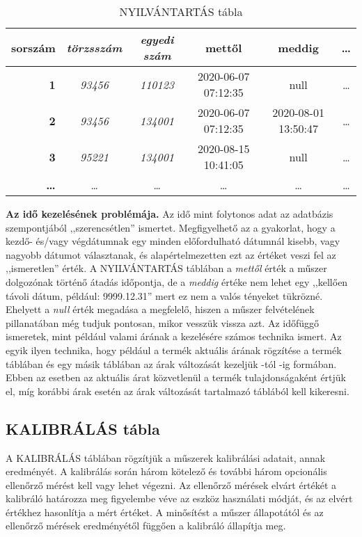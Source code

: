 \documentclass[a4paper,12pt]{report}
\newcommand{\tabla}[1]{\noindent\MakeUppercase{#1}} %
\begin{document}
\begin{table}[ht!]
	\centering
	\begin{footnotesize}
	\begin{tabular}[t]{|r|c|c|c|c|c|}
		\hline
		\textbf{sorszám}&\textit{törzsszám}&\textit{egyedi szám}&mettől&meddig&\dots \\ \hline
		\textbf{1}&\textit{93456}&\textit{110123}&2020-06-07 07:12:35&null&\dots\\
		\textbf{2}&\textit{93456}&\textit{134001}&2020-06-07 07:12:35&2020-08-01 13:50:47&\dots\\
		\textbf{3}&\textit{95221}&\textit{134001}&2020-08-15 10:41:05&null&\dots\\
		\textbf{\dots}&\textit{\dots}&\textit{\dots}&\dots&\dots&\dots\\
	\end{tabular}
\end{footnotesize}
	\caption{NYILVÁNTARTÁS tábla}\label{tabNYILVANTARTAS}
\end{table}


\begin{minipage}[t]{\linewidth}
\textsf{
		{\footnotesize \textbf{Az idő kezelésének problémája.}
	Az idő mint folytonos adat az adatbázis szempontjából ,,szerencsétlen'' ismertet. 
	Meg\-fi\-gyel\-he\-tő az a gyakorlat, hogy a kezdő- és/vagy végdátumnak egy minden előfordulható dátumnál kisebb, vagy nagyobb dátumot választanak, és alapértelmezetten ezt az értéket veszi fel az ,,ismeretlen'' érték.
	A \tabla{nyilvántartás} táblában a \textit{mettől} érték a műszer dolgozónak történő átadás időpontja, de a \textit{meddig} értéke nem lehet egy ,,kellően távoli dátum, például: 9999.12.31'' mert ez nem a valós tényeket tükrözné. Ehelyett a \textit{null} érték megadása a megfelelő, hiszen a műszer felvételének pillanatában még tudjuk pontosan, mikor vesszük vissza azt.
	Az időfüggő ismeretek, mint például valami árának a kezelésére számos technika ismert. Az egyik ilyen technika, hogy például a termék aktuális árának rögzítése a termék táblában és egy másik táblában az árak változását kezeljük -tól -ig formában. Ebben az esetben az aktuális árat közvetlenül a termék tulajdonságaként értjük el, míg korábbi árak esetén az árak változását tartalmazó táblából kell kikeresni.
	}
}
\end{minipage}

\subsection{KALIBRÁLÁS tábla}
A \tabla{kalibrálás} táblában rögzítjük a műszerek kalibrálási adatait, annak eredményét. A kalibrálás során három kötelező és további három opcionális ellenőrző mérést kell vagy lehet végezni. Az ellenőrző mérések elvárt értékét a kalibráló határozza meg figyelembe véve az eszköz használati módját, és az elvért értékhez hasonlítja a mért értéket. A minősítést a műszer állapotától és az ellenőrző mérések eredményétől függően a kalibráló állapítja meg.
\\
\end{document}

